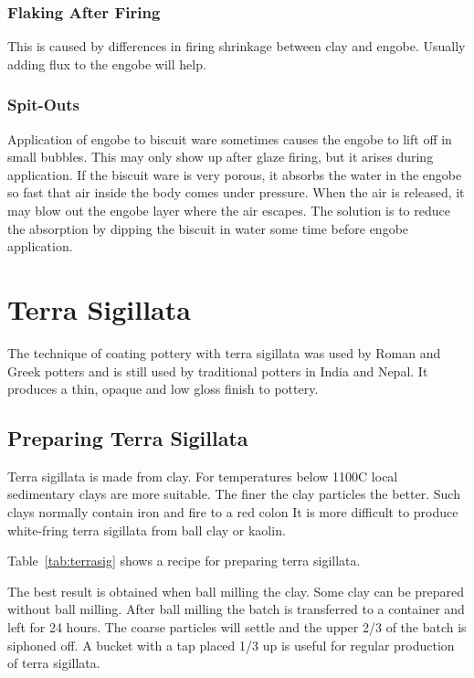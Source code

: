 \subsubsection{Flaking After Firing}
This is caused by differences in firing shrinkage between clay and engobe. 
Usually adding flux to the engobe will help.
\subsubsection{Spit-Outs}
Application of engobe to biscuit ware sometimes causes the engobe to lift off 
in small bubbles. This may only show up after glaze firing, but it arises 
during application. If the biscuit ware is very porous, it absorbs the water in 
the engobe so fast that air inside the body comes under pressure. When the air 
is released, it may blow out the engobe layer where the air escapes. The 
solution is to reduce the absorption by dipping the biscuit in water some time 
before engobe application.
\section{Terra Sigillata}
The technique of coating pottery with terra sigillata was used by Roman and 
Greek potters and is still used by traditional potters in India and Nepal. It 
produces a thin, opaque and low gloss finish to pottery.
\subsection{Preparing Terra Sigillata}
Terra sigillata is made from clay. For temperatures below 1100\degree C local 
sedimentary clays are more suitable. The finer the clay particles the better. 
Such clays normally contain iron and fire to a red colon It is more difficult 
to produce white-fring terra sigillata from ball clay or kaolin.

Table~\ref{tab:terrasig} shows a recipe for preparing terra sigillata.

The best result is obtained when ball milling the clay. Some clay can be 
prepared without ball milling. After ball milling the batch is transferred to a 
container and left for 24 hours. The coarse particles will settle and the upper 
2/3 of the batch is siphoned off. A bucket with a tap placed 1/3 up is useful 
for regular production of terra sigillata.

